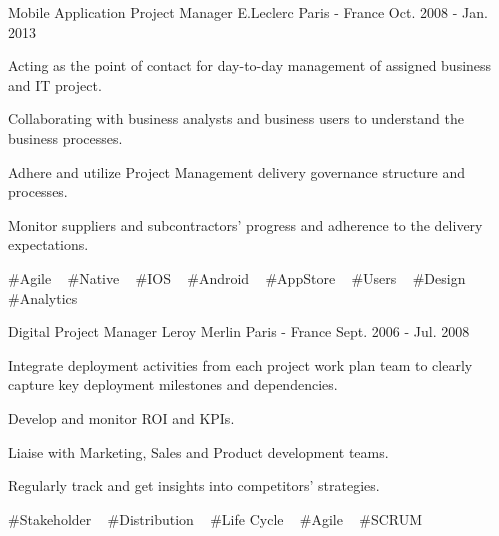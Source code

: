 \begin{cventries}
  \cventry
    {Mobile Application Project Manager} %
    {E.Leclerc} %
    {Paris - France} %
    {Oct. 2008 - Jan. 2013} %
    {
      \begin{cvitems} %
        \item {Acting as the point of contact for day-to-day management of assigned business and IT project.}
        \item {Collaborating with business analysts and business users to understand the business processes.}
        \item {Adhere and utilize Project Management delivery governance structure and processes.}
        \item {Monitor suppliers and subcontractors' progress and adherence to the delivery expectations.}
      \end{cvitems}
    }
    {
      \#Agile ~
      \#Native ~
      \#IOS ~
      \#Android ~
      \#AppStore ~
      \#Users ~
      \#Design ~
      \#Analytics ~
    }

  \cventry
    {Digital Project Manager} %
    {Leroy Merlin} %
    {Paris - France} %
    {Sept. 2006 - Jul. 2008} %
    {
      \begin{cvitems} %
        \item {Integrate deployment activities from each project work plan team to clearly capture key deployment milestones and dependencies.}
        \item {Develop and monitor ROI and KPIs.}
        \item {Liaise with Marketing, Sales and Product development teams.}
        \item {Regularly track and get insights into competitors' strategies.}
      \end{cvitems}
    }
    {
      \#Stakeholder ~
      \#Distribution ~
      \#Life Cycle ~
      \#Agile ~
      \#SCRUM ~
    }

\end{cventries}
